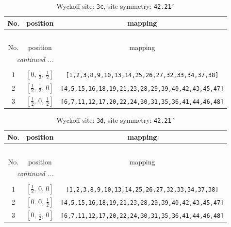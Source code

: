 \documentclass[fleqn,8pt]{jsarticle}
\begin{document}
\renewcommand{\arraystretch}{1.2}
\begin{longtable}{ccc}
\caption{Wyckoff site: {\tt 3c}, site symmetry: {\tt 42.21'}}
 \\
 \hline \hline
No. & position & mapping \\ \hline \endfirsthead

\multicolumn{2}{l}{\tablename\ \thetable{}} \\
 \hline \hline
No. & position & mapping \\ \hline \endhead

 \hline \hline
\multicolumn{2}{r}{\footnotesize\it continued ...} \\ \endfoot

 \hline \hline
\multicolumn{2}{r}{} \\ \endlastfoot

1 & $\left[ 0,\, \frac{1}{2},\, \frac{1}{2} \right]$ & {\tt [1,2,3,8,9,10,13,14,25,26,27,32,33,34,37,38]} \\ \hline
2 & $\left[ \frac{1}{2},\, \frac{1}{2},\, 0 \right]$ & {\tt [4,5,15,16,18,19,21,23,28,29,39,40,42,43,45,47]} \\ \hline
3 & $\left[ \frac{1}{2},\, 0,\, \frac{1}{2} \right]$ & {\tt [6,7,11,12,17,20,22,24,30,31,35,36,41,44,46,48]} \\
\end{longtable}
\renewcommand{\arraystretch}{1.2}
\begin{longtable}{ccc}
\caption{Wyckoff site: {\tt 3d}, site symmetry: {\tt 42.21'}}
 \\
 \hline \hline
No. & position & mapping \\ \hline \endfirsthead

\multicolumn{2}{l}{\tablename\ \thetable{}} \\
 \hline \hline
No. & position & mapping \\ \hline \endhead

 \hline \hline
\multicolumn{2}{r}{\footnotesize\it continued ...} \\ \endfoot

 \hline \hline
\multicolumn{2}{r}{} \\ \endlastfoot

1 & $\left[ \frac{1}{2},\, 0,\, 0 \right]$ & {\tt [1,2,3,8,9,10,13,14,25,26,27,32,33,34,37,38]} \\ \hline
2 & $\left[ 0,\, 0,\, \frac{1}{2} \right]$ & {\tt [4,5,15,16,18,19,21,23,28,29,39,40,42,43,45,47]} \\ \hline
3 & $\left[ 0,\, \frac{1}{2},\, 0 \right]$ & {\tt [6,7,11,12,17,20,22,24,30,31,35,36,41,44,46,48]} \\
\end{longtable}
\end{document}
